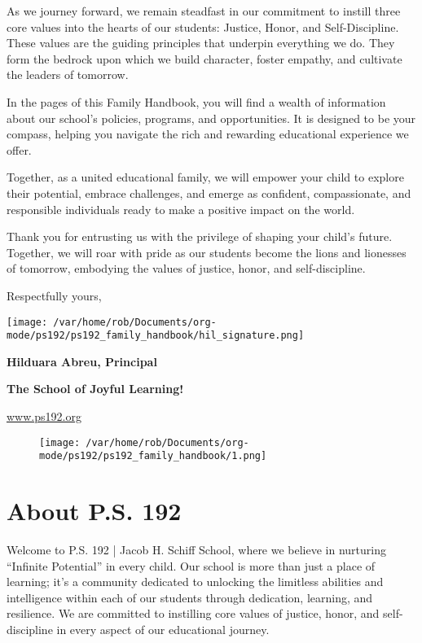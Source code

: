 \documentclass[letterpaper, 11pt]{article}
\begin{document}
As we journey forward, we remain steadfast in our commitment to instill three core values into the hearts of our students: Justice, Honor, and Self-Discipline. These values are the guiding principles that underpin everything we do. They form the bedrock upon which we build character, foster empathy, and cultivate the leaders of tomorrow.

In the pages of this Family Handbook, you will find a wealth of information about our school’s policies, programs, and opportunities. It is designed to be your compass, helping you navigate the rich and rewarding educational experience we offer.

Together, as a united educational family, we will empower your child to explore their potential, embrace challenges, and emerge as confident, compassionate, and responsible individuals ready to make a positive impact on the world.

Thank you for entrusting us with the privilege of shaping your child’s future. Together, we will roar with pride as our students become the lions and lionesses of tomorrow, embodying the values of justice, honor, and self-discipline.

Respectfully yours,

\texttt{[image: /var/home/rob/Documents/org-mode/ps192/ps192\_family\_handbook/hil\_signature.png]}

\textbf{\textbf{Hilduara Abreu, Principal}}

\textbf{\textbf{The School of Joyful Learning!}}

\href{https://www.ps192.org}{www.ps192.org}

\begin{figure}[b]  %
  \centering
  \texttt{[image: /var/home/rob/Documents/org-mode/ps192/ps192\_family\_handbook/1.png]}
  \label{fig:fronpage bottom_image}
\end{figure}

\clearpage

\section{About P.S. 192}
\label{sec:org68ad621}

Welcome to P.S. 192 | Jacob H. Schiff School, where we believe in nurturing ``Infinite Potential'' in every child. Our school is more than just a place of learning; it’s a community dedicated to unlocking the limitless abilities and intelligence within each of our students through dedication, learning, and resilience. We are committed to instilling core values of justice, honor, and self-discipline in every aspect of our educational journey.
\end{document}
